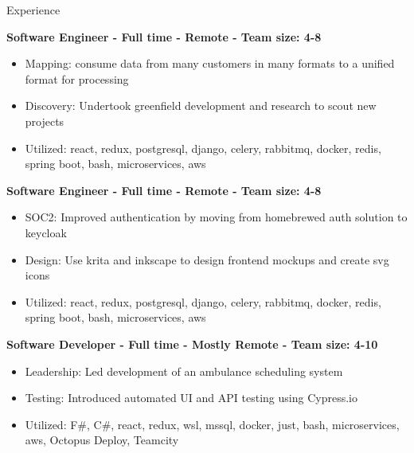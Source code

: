 \documentclass{resume} %
\begin{document}
\begin{rSection}{Experience}

\textbf{Software Engineer - Full time - Remote - Team size: 4-8} \\

\begin{itemize}
  \itemsep -2pt {}
      \item Mapping: consume data from many customers in many formats to a unified format for processing
    \item Discovery: Undertook greenfield development and research to scout new projects
    \item Utilized: react, redux, postgresql, django, celery, rabbitmq, docker, redis, spring boot, bash, microservices, aws
\end{itemize}

\textbf{Software Engineer - Full time - Remote - Team size: 4-8} \\

\begin{itemize}
  \itemsep -2pt {}
      \item SOC2: Improved authentication by moving from homebrewed auth solution to keycloak
    \item Design: Use krita and inkscape to design frontend mockups and create svg icons
    \item Utilized: react, redux, postgresql, django, celery, rabbitmq, docker, redis, spring boot, bash, microservices, aws
\end{itemize}

\textbf{Software Developer - Full time - Mostly Remote - Team size: 4-10} \\

\begin{itemize}
  \itemsep -2pt {}
      \item Leadership: Led development of an ambulance scheduling system
    \item Testing: Introduced automated UI and API testing using Cypress.io
    \item Utilized: F\#, C\#, react, redux, wsl, mssql, docker, just, bash, microservices, aws, Octopus Deploy, Teamcity
\end{itemize}


\end{rSection}
\end{document}
